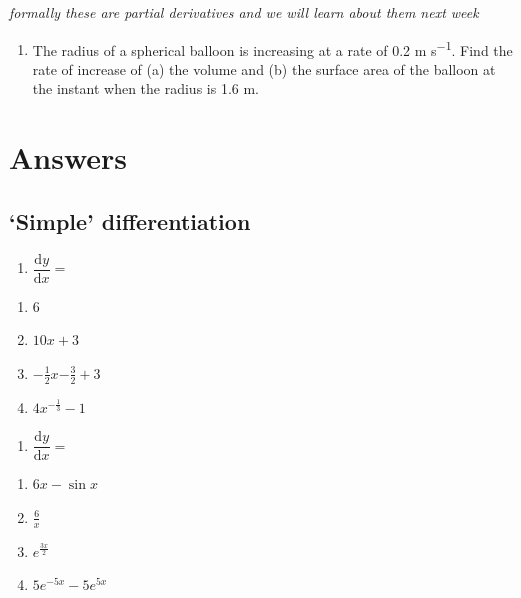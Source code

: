 \documentclass[
]{book}
\providecommand{\tightlist}{%
  \setlength{\itemsep}{0pt}\setlength{\parskip}{0pt}}
\begin{document}
\emph{formally these are partial derivatives and we will learn about them next week}

\begin{enumerate}
\def\labelenumi{\arabic{enumi}.}
\setcounter{enumi}{2}
\tightlist
\item
  The radius of a spherical balloon is increasing at a rate of 0.2 m s\textsuperscript{−1}. Find the rate of increase of (a) the volume and (b) the surface area of the balloon at the instant when the radius is 1.6 m.
\end{enumerate}

\hypertarget{sec:Answers4}{%
\section{Answers}\label{sec:Answers4}}

\hypertarget{simple-differentiation-1}{%
\subsection{`Simple' differentiation}\label{simple-differentiation-1}}

\begin{enumerate}
\def\labelenumi{\arabic{enumi}.}
\tightlist
\item
  \(\dfrac{\textrm{d}y}{\textrm{d}x}=\)
\end{enumerate}

\begin{enumerate}
\def\labelenumi{\alph{enumi}.}
\tightlist
\item
  6
\item
  \(10x+3\)
\item
  \(-\frac{1}{2}x{-\frac{3}{2}}+3\)
\item
  \(4x^{-\frac{1}{3}}-1\)
\end{enumerate}

\begin{enumerate}
\def\labelenumi{\arabic{enumi}.}
\setcounter{enumi}{1}
\tightlist
\item
  \(\dfrac{\textrm{d}y}{\textrm{d}x}=\)
\end{enumerate}

\begin{enumerate}
\def\labelenumi{\alph{enumi}.}
\tightlist
\item
  \(6x-\sin x\)
\item
  \(\frac{6}{x}\)
\item
  \(e^{\frac{3x}{2}}\)
\item
  \(5e^{-5x}-5e^{5x}\)
\end{enumerate}
\end{document}
